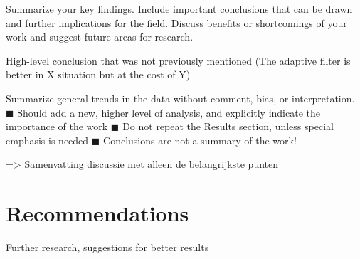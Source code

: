 Summarize your key findings. Include important conclusions that can be drawn and further implications for the field. Discuss benefits or shortcomings of your work and suggest future areas for research.

High-level conclusion that was not previously mentioned (The adaptive filter is better in X situation but at the cost of Y)

Summarize general trends in the data without comment, bias, or interpretation.
◼ Should add a new, higher level of analysis, and explicitly indicate the importance
of the work
◼ Do not repeat the Results section, unless special emphasis is needed
◼ Conclusions are not a summary of the work!

=> Samenvatting discussie met alleen de belangrijkste punten

\section{Recommendations}
Further research, suggestions for better results